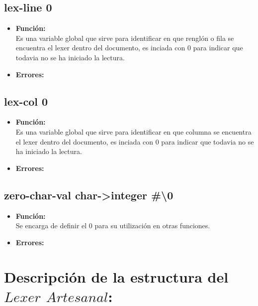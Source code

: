 \documentclass{article}
\begin{document}
\subsection{lex-line 0}
\begin{itemize}
    \item \textbf{Función:} \\
    Es una variable global que sirve para identificar en que renglón o fila se encuentra el lexer dentro del documento, es inciada con 0 para indicar que todavia no se ha iniciado la lectura.
    \item \textbf{Errores:} \\
\end{itemize}
\subsection{lex-col 0}
\begin{itemize}
    \item \textbf{Función:} \\
    Es una variable global que sirve para identificar en que columna se encuentra el lexer dentro del documento, es inciada con 0 para indicar que todavia no se ha iniciado la lectura.
    \item \textbf{Errores:} \\ 
\end{itemize}
\subsection{zero-char-val char-\textgreater integer \#\textbackslash0}
\begin{itemize}
    \item \textbf{Función:} \\
    Se encarga de definir el 0 para su utilización en otras funciones.
    \item \textbf{Errores:} \\ 
\end{itemize}
\section{Descripción de la estructura del $Lexer$ $Artesanal$:}
\end{document}
